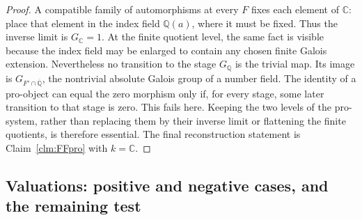 \begin{proof}
A compatible family of automorphisms at every \(F\) fixes each
element of \(\mathbb C\): place that element in the index field
\(\mathbb Q(a)\), where it must be fixed. Thus the inverse
limit is \(G_{\mathbb C}=1\). At the finite quotient level,
the same fact is visible because the index field may be enlarged
to contain any chosen finite Galois extension.
Nevertheless no transition to the stage \(G_{\mathbb Q}\)
is the trivial map. Its image is
\(G_{F'\cap\overline{\mathbb Q}}\), the nontrivial absolute
Galois group of a number field. The identity of a pro-object
can equal the zero morphism only if, for every stage, some later
transition to that stage is zero. This fails here. Keeping the
two levels of the pro-system, rather than replacing them by
their inverse limit or flattening the finite quotients, is
therefore essential. The final reconstruction statement is
Claim~\ref{clm:FFpro} with \(k=\mathbb C\).
\end{proof}


\subsection{Valuations: positive and negative cases, and the remaining test}

